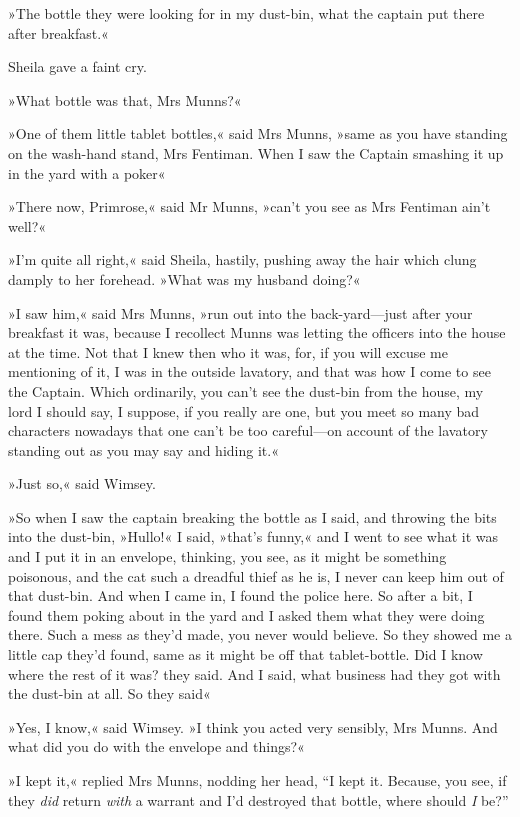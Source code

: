 »The bottle they were looking for in my dust-bin, what the captain put there after breakfast.«

Sheila gave a faint cry.

»What bottle was that, Mrs Munns?«

»One of them little tablet bottles,« said Mrs Munns, »same as you have standing on the wash-hand stand, Mrs Fentiman. When I saw the Captain smashing it up in the yard with a poker\longdash«

»There now, Primrose,« said Mr Munns, »can't you see as Mrs Fentiman ain't well?«

»I'm quite all right,« said Sheila, hastily, pushing away the hair which clung damply to her forehead. »What was my husband doing?«

»I saw him,« said Mrs Munns, »run out into the back-yard\allowbreak---\allowbreak just after your breakfast it was, because I recollect Munns was letting the officers into the house at the time. Not that I knew then who it was, for, if you will excuse me mentioning of it, I was in the outside lavatory, and that was how I come to see the Captain. Which ordinarily, you can't see the dust-bin from the house, my lord I should say, I suppose, if you really are one, but you meet so many bad characters nowadays that one can't be too careful\allowbreak---\allowbreak on account of the lavatory standing out as you may say and hiding it.«

»Just so,« said Wimsey.

»So when I saw the captain breaking the bottle as I said, and throwing the bits into the dust-bin, »Hullo!« I said, »that's funny,« and I went to see what it was and I put it in an envelope, thinking, you see, as it might be something poisonous, and the cat such a dreadful thief as he is, I never can keep him out of that dust-bin. And when I came in, I found the police here. So after a bit, I found them poking about in the yard and I asked them what they were doing there. Such a mess as they'd made, you never would believe. So they showed me a little cap they'd found, same as it might be off that tablet-bottle. Did I know where the rest of it was? they said. And I said, what business had they got with the dust-bin at all. So they said\longdash«

»Yes, I know,« said Wimsey. »I think you acted very sensibly, Mrs Munns. And what did you do with the envelope and things?«

»I kept it,« replied Mrs Munns, nodding her head, \enquote{I kept it. Because, you see, if they \textit{did} return \textit{with} a warrant and I'd destroyed that bottle, where should \textit{I} be?}

